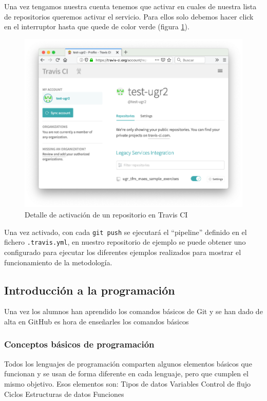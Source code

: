 Una vez tengamos nuestra cuenta tenemos que activar en cuales de nuestra lista de repositorios queremos activar el servicio. Para ellos solo debemos hacer click en el interruptor hasta que quede de color verde (figura \ref{fig:travis_enable}).

\begin{figure}[H]
\centering
\includegraphics[width=1.0\textwidth]{../images/travis_enable}
\caption{Detalle de activación de un repositorio en Travis CI}
\label{fig:travis_enable}
\end{figure}

Una vez activado, con cada \texttt{git push} se ejecutará el ``pipeline'' definido en el fichero \texttt{.travis.yml}, en nuestro repositorio de ejemplo se puede obtener uno configurado para ejecutar los diferentes ejemplos realizados para mostrar el funcionamiento de la metodología.

\subsection{Introducción a la programación}

Una vez los alumnos han aprendido los comandos básicos de Git y se han dado de alta en GitHub es hora de enseñarles los comandos básicos

\subsubsection{Conceptos básicos de programación}

Todos los lenguajes de programación comparten algunos elementos básicos que funcionan y se usan de forma diferente en cada lenguaje, pero que cumplen el mismo objetivo. Esos elementos son:
Tipos de datos
Variables
Control de flujo
Ciclos
Estructuras de datos
Funciones


